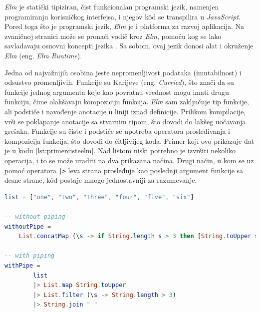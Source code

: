 \documentclass[12pt,oneside]{memoir}
\begin{document}
\par \emph{Elm} je statički tipiziran, čist funkcionalan programski jezik, namenjen programiranju korisničkog interfejsa, i njegov k\^{o}d se transpilira u \emph{JavaScript}. Pored toga što je programski jezik, \emph{Elm} je i platforma za razvoj aplikacija. Na zvaničnoj stranici može se pronaći vodič kroz \emph{Elm}, pomoću kog se lako savladavaju osnovni koncepti jezika \cite{elm-lang-official}. Sa sobom, ovaj jezik donosi alat i okruženje \emph{Elm} (eng. \emph{Elm Runtime}). 
\par Jedna od najvažnijih osobina jeste nepromenljivost podataka (imutabilnost) i odsustvo promenljivih. Funkcije su Karijeve (eng. \emph{Curried}), što znači da su funkcije jednog argumenta koje kao povratnu vrednost mogu imati drugu funkciju, čime olakšavaju kompoziciju funkcija. \emph{Elm} sam zaključuje tip funkcije, ali podstiče i navođenje anotacije u liniji iznad definicije. Prilikom kompilacije, vrši se poklapanje anotacije sa stvarnim tipom, što dovodi do lakšeg uočavanja grešaka. Funkcije su čiste i podstiče se upotreba operatora prosleđivanja i kompozicija funkcija, što dovodi do čitljivijeg koda. Primer koji ovo prikazuje dat je u kodu \ref{lst:primercisteelm}. Nad listom niski potrebno je izvršiti nekoliko operacija, i to se može uraditi na dva prikazana načina. Drugi način, u kom se uz pomoć operatora \texttt{|>} leva strana prosleđuje kao poslednji argument funkcije sa desne strane, k\^{o}d postaje mnogo jednostavniji za razumevanje. \\


\begin{minipage}{\linewidth}
\begin{lstlisting}[language=elm, basicstyle=\small, caption={Primer kompozicije funkcija upotrebom operatora prosleđivanja \\ },captionpos=b, label={lst:primercisteelm}]
list = ["one", "two", "three", "four", "five", "six"]

-- without piping
withoutPipe =
    List.concatMap (\s -> if String.length s > 3 then [String.toUpper s] else []) list
 
-- with piping
withPipe =
        list
        |> List.map String.toUpper
        |> List.filter (\s -> String.length > 3)
        |> String.join " "
\end{lstlisting}
\end{minipage}
\par
\end{document}

